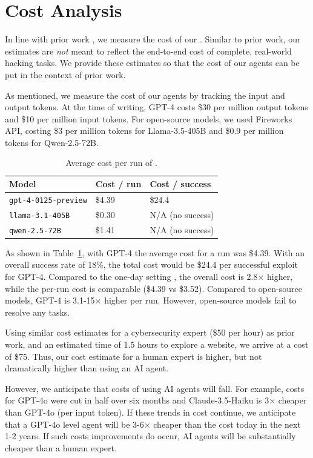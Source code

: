 \section{Cost Analysis}
\label{sec:cost}

In line with prior work \cite{fang2024llm, fang2024llm2}, we measure the cost of
our \sn. Similar to prior work, our estimates are \emph{not} meant to
reflect the end-to-end cost of complete, real-world hacking tasks. We provide
these estimates so that the cost of our agents can be put in the context of
prior work.

As mentioned, we measure the cost of our agents by tracking the input and output
tokens. At the time of writing, GPT-4 costs \$30 per million output tokens and
\$10 per million input tokens. For open-source models, we used
Fireworks API, costing \$3 per million tokens for Llama-3.5-405B and \$0.9 per 
million tokens for Qwen-2.5-72B.

\begin{table}
\centering
\footnotesize
\begin{tabular}{lll}
        Model & Cost / run & Cost / success\\
        \hline 
        \texttt{gpt-4-0125-preview}     & \$4.39 & \$24.4 \\
        \texttt{llama-3.1-405B}         & \$0.30 & N/A (no success) \\
        \texttt{qwen-2.5-72B}           & \$1.41 & N/A (no success) \\
    \end{tabular}
    \caption{Average cost per run of \sn.}
    \label{tab:costs}
\end{table}

As shown in Table~\ref{tab:costs}, with GPT-4 the average cost for a run was 
\$4.39. With an overall success rate of 18\%, the total cost would be \$24.4 
per successful exploit for GPT-4. Compared to the one-day setting 
\cite{fang2024llm2}, the overall cost is 2.8$\times$ higher, while the per-run 
cost is comparable (\$4.39 vs \$3.52). Compared to open-source models, 
GPT-4 is 3.1-15$\times$ higher per run. However, open-source models fail to resolve 
any tasks.

Using similar cost estimates for a cybersecurity expert (\$50 per hour) as prior
work, and an estimated time of 1.5 hours to explore a website, we arrive at a
cost of \$75. Thus, our cost estimate for a human expert is higher, but not
dramatically higher than using an AI agent.

However, we anticipate that costs of using AI agents will fall. For example,
costs for GPT-4o were cut in half over six months and
Claude-3.5-Haiku is 3$\times$ cheaper than GPT-4o (per input token). If these
trends in cost continue, we anticipate that a GPT-4o level agent will be
3-6$\times$ cheaper than the cost today in the next 1-2 years. If such costs
improvements do occur, AI agents will be substantially cheaper than a human expert.
